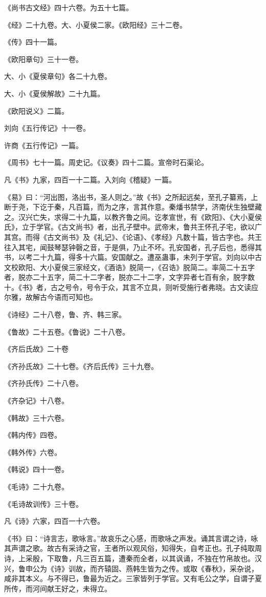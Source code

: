 \documentclass[]{article}
\begin{document}
《尚书古文经》四十六卷。为五十七篇。

《经》二十九卷。大、小夏侯二家。《欧阳经》三十二卷。

《传》四十一篇。

《欧阳章句》三十一卷。

大、小《夏侯章句》各二十九卷。

大、小《夏侯解故》二十九篇。

《欧阳说义》二篇。

刘向《五行传记》十一卷。

许商《五行传记》一篇。

《周书》七十一篇。周史记。《议奏》四十二篇。宣帝时石渠论。

凡《书》九家，四百一十二篇。入刘向《稽疑》一篇。

《易》曰：``河出图，洛出书，圣人则之。''故《书》之所起远矣，至孔子纂焉，上断于尧，下讫于秦，凡百篇，而为之序，言其作意。秦燔书禁学，济南伏生独壁藏之。汉兴亡失，求得二十九篇，以教齐鲁之间。讫孝宣世，有《欧阳》、《大小夏侯氏》，立于学官。《古文尚书》者，出孔子壁中。武帝末，鲁共王怀孔子宅，欲以广其宫。而得《古文尚书》及《礼记》、《论语》、《孝经》凡数十篇，皆古字也。共王往入其宅，闻鼓琴瑟钟磬之音，于是俱，乃止不坏。孔安国者，孔子后也，悉得其书，以考二十九篇，得多十六篇。安国献之。遭巫蛊事，未列于学官。刘向以中古文校欧阳、大小夏侯三家经文，《酒诰》脱简一，《召诰》脱简二。率简二十五字者，脱亦二十五字，简二十二字者，脱亦二十二字，文字异者七百有余，脱字数十。《书》者，古之号令，号令于众，其言不立具，则听受施行者弗晓。古文读应尔雅，故解古今语而可知也。

《诗经》二十八卷，鲁、齐、韩三家。

《鲁故》二十五卷。《鲁说》二十八卷。

《齐后氏故》二十卷

《齐孙氏故》二十七卷。《齐后氏传》三十九卷。

《齐孙氏传》二十八卷。

《齐杂记》十八卷。

《韩故》三十六卷。

《韩内传》四卷。

《韩外传》六卷。

《韩说》四十一卷。

《毛诗》二十九卷。

《毛诗故训传》三十卷。

凡《诗》六家，四百一十六卷。

《书》曰：``诗言志，歌咏言。''故哀乐之心感，而歌咏之声发。诵其言谓之诗，咏其声谓之歌。故古有采诗之官，王者所以观风俗，知得失，自考正也。孔子纯取周诗，上采殷，下取鲁，凡三百五篇，遭秦而全者，以其讽诵，不独在竹帛故也。汉兴，鲁申公为《诗》训故，而齐辕固、燕韩生皆为之传。或取《春秋》，采杂说，咸非其本义。与不得已，鲁最为近之。三家皆列于学官。又有毛公之学，自谓子夏所传，而河间献王好之，未得立。
\end{document}

